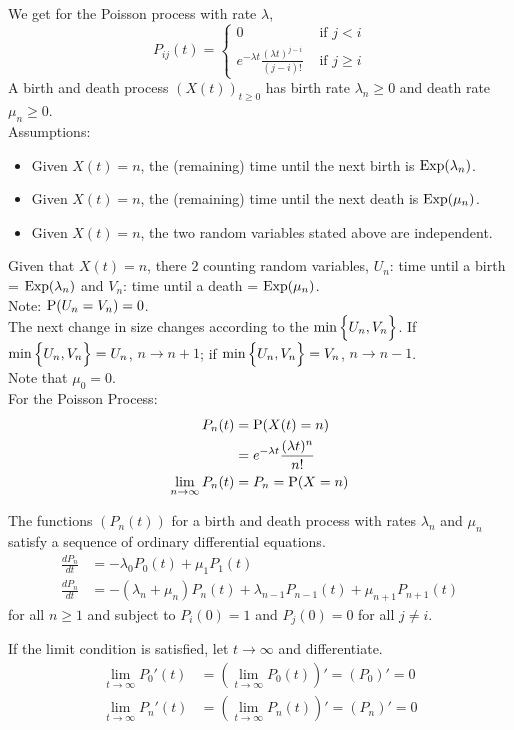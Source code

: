 \documentclass[12pt]{article}
\begin{document}
 We get for the Poisson process with rate $\lambda$, 
 $$P_{ij}(t) = \begin{cases} 0 &\text{ if } j < i \\ e^{-\lambda t} \frac{(\lambda t)^{j-i}}{(j-i)!} &\text{ if } j \geq i \end{cases} $$ 
 A birth and death process $(X(t))_{t \geq 0}$ has birth rate $\lambda_n \geq 0$ and death rate $\mu_n \geq 0$. \\
 Assumptions: \begin{itemize} 
 \item Given $X(t) = n$, the (remaining) time until the next birth is $\text{Exp}( \lambda_n )$. 
 \item Given $X(t) = n$, the (remaining) time until the next death is $\text{Exp}( \mu_n )$. 
 \item Given $X(t) = n$, the two random variables stated above are independent. \end{itemize} 
 Given that $X(t) =n $, there $2$ counting random variables, $U_n$: time until a birth = $\text{Exp}( \lambda_n )$ and $V_n$: time until a death = $\text{Exp}( \mu_n )$. \\
 Note: $\mathrm{P}( U_n = V_n ) = 0$. \\
 The next change in size changes according to the $\min \Big\{ U_n,V_n \Big\}$. If $\min\Big\{ U_n,V_n \Big\} = U_n$, $n \to n+1$; if $\min\Big\{ U_n,V_n \Big\} = V_n$, $n \to n-1$.\\
 Note that $\mu_0 = 0$. \\
 For the Poisson Process: $$ \begin{aligned} 
 P_n(t) &= \mathrm{P}( X(t) = n ) \\ &= e^{-\lambda t} \frac{(\lambda t)^n}{n!} \\
\lim_{n\to\infty} P_n(t) &= P_n = \mathrm{P}( X=n ) \end{aligned} $$ 
\begin{theorem} The functions $(P_n(t))$ for a birth and death process with rates $\lambda_n$ and $\mu_n$ satisfy a sequence of ordinary differential equations. 
$$ \begin{aligned} \frac{dP_n}{dt} &= -\lambda_0P_0(t) + \mu_1P_1(t) \\ 
\frac{dP_n}{dt} &= -(\lambda_n + \mu_n)P_n(t) + \lambda_{n-1}P_{n-1}(t) + \mu_{n+1}P_{n+1}(t) \end{aligned} $$ 
for all $n \geq 1$ and subject to $P_i(0) = 1$ and $P_j(0) = 0$ for all $j \neq i$. \end{theorem} 
If the limit condition is satisfied, let $t \to \infty$ and differentiate. 
$$ \begin{aligned} \lim_{t \to \infty} P_0'(t) &= (\lim_{t\to\infty} P_0(t))' = (P_0)' = 0\\
\lim_{t\to\infty} P_n'(t) &= (\lim_{t\to\infty} P_n(t))' = (P_n)' = 0 \end{aligned} $$ 
\end{document}
